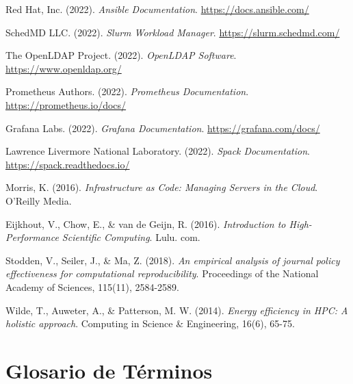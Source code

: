 \documentclass[12pt,a4paper]{report}
\begin{document}
\begin{thebibliography}{99}

 Red Hat, Inc. (2022). \textit{Ansible Documentation}. \url{https://docs.ansible.com/}

 SchedMD LLC. (2022). \textit{Slurm Workload Manager}. \url{https://slurm.schedmd.com/}

 The OpenLDAP Project. (2022). \textit{OpenLDAP Software}. \url{https://www.openldap.org/}

 Prometheus Authors. (2022). \textit{Prometheus Documentation}. \url{https://prometheus.io/docs/}

 Grafana Labs. (2022). \textit{Grafana Documentation}. \url{https://grafana.com/docs/}

 Lawrence Livermore National Laboratory. (2022). \textit{Spack Documentation}. \url{https://spack.readthedocs.io/}

 Morris, K. (2016). \textit{Infrastructure as Code: Managing Servers in the Cloud}. O'Reilly Media.

 Eijkhout, V., Chow, E., \& van de Geijn, R. (2016). \textit{Introduction to High-Performance Scientific Computing}. Lulu. com.

 Stodden, V., Seiler, J., \& Ma, Z. (2018). \textit{An empirical analysis of journal policy effectiveness for computational reproducibility}. Proceedings of the National Academy of Sciences, 115(11), 2584-2589.

 Wilde, T., Auweter, A., \& Patterson, M. W. (2014). \textit{Energy efficiency in HPC: A holistic approach}. Computing in Science \& Engineering, 16(6), 65-75.

\end{thebibliography}

\appendix

\chapter{Glosario de Términos}
\end{document}
